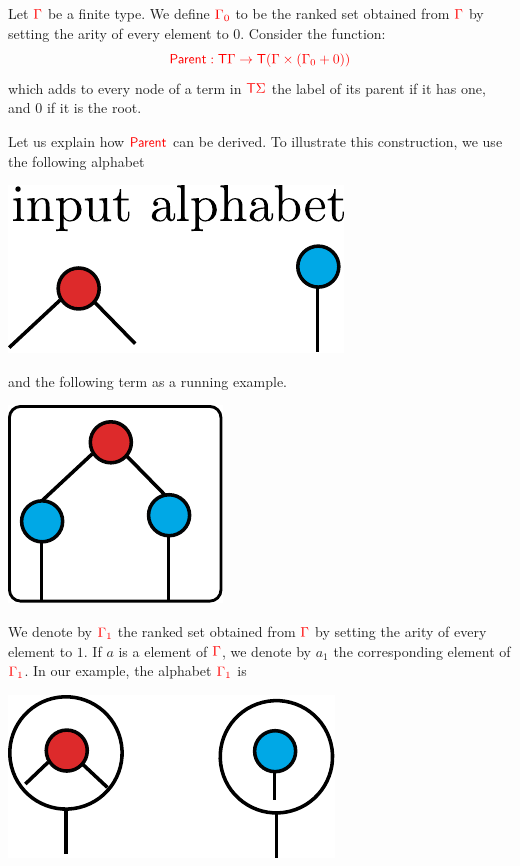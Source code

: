 \noindent \begin{example}\label{ex:sibling}  Let ${\color{red}{\Gamma}}$ be a finite type. We define ${\color{red}{{\color{red}{\Gamma}}_0}}$  to be the ranked set obtained from ${\color{red}{\Gamma}}$ by setting the arity of every element to $0$.  
\medskip
Consider the function:
$${\color{red}{ \mathsf{Parent}: {\color{red}{\mathsf T}}{\color{red}{\Gamma}}\to {\color{red}{\mathsf T}}({\color{red}{\Gamma}}\times({\color{red}{\Gamma}}_0+0))}}$$
which adds to every node of a term in ${\color{red}{\mathsf T}} {\color{red}{\Sigma}}$ the label  of its parent if it has one, and $0$ if it is the root.

Let us explain how ${\color{red}{\mathsf{Parent}}}$ can be derived. To illustrate this construction, we use the following alphabet
\begin{center}
		 \includegraphics[scale=.4]{pictures/parent-alphabet.pdf}
		\end{center}
and the following term as a running example.
\begin{center}
		 \includegraphics[scale=.4]{pictures/parent-example.pdf}
		\end{center}
We denote by ${\color{red}{\Gamma_1}}$ the ranked set obtained from ${\color{red}{\Gamma}}$ by setting the arity of every element to $1$. If $a$ is a element of ${\color{red}{\Gamma}}$, we denote by $a_1$ the corresponding element of ${\color{red}{\Gamma_1}}$. In our example, the alphabet ${\color{red}{\Gamma_1}}$ is
\begin{center}
		\includegraphics[scale=.4]{pictures/parent-unary-alphabet.pdf}

\end{center}
\end{example}

